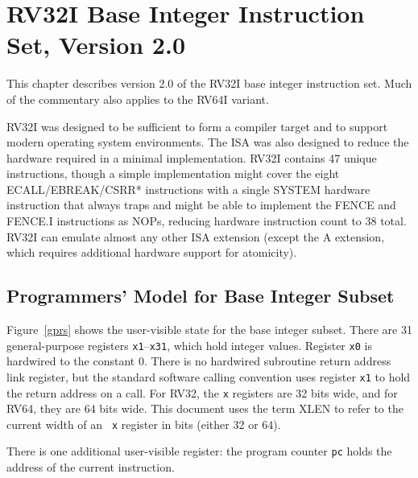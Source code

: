 \chapter{RV32I Base Integer Instruction Set, Version 2.0}
\label{rv32}

This chapter describes version 2.0 of the RV32I base integer
instruction set.  Much of the commentary also applies to the RV64I
variant.

\begin{commentary}
RV32I was designed to be sufficient to form a compiler target and to
support modern operating system environments.  The ISA was also
designed to reduce the hardware required in a minimal implementation.
RV32I contains 47 unique instructions, though a simple implementation
might cover the eight ECALL/EBREAK/CSRR* instructions with a single
SYSTEM hardware instruction that always traps and might be able to
implement the FENCE and FENCE.I instructions as NOPs, reducing
hardware instruction count to 38 total.  RV32I can emulate almost any
other ISA extension (except the A extension, which requires additional
hardware support for atomicity).
\end{commentary}

\section{Programmers' Model for Base Integer Subset}

Figure~\ref{gprs} shows the user-visible state for the base integer
subset.  There are 31 general-purpose registers {\tt x1}--{\tt x31},
which hold integer values.  Register {\tt x0} is hardwired to the
constant 0.  There is no hardwired subroutine return address link
register, but the standard software calling convention uses register
{\tt x1} to hold the return address on a call.  For RV32, the {\tt x}
registers are 32 bits wide, and for RV64, they are 64 bits wide.  This
document uses the term XLEN to refer to the current width of an {\tt
  x} register in bits (either 32 or 64).

There is one additional user-visible register: the program counter {\tt pc}
holds the address of the current instruction.

